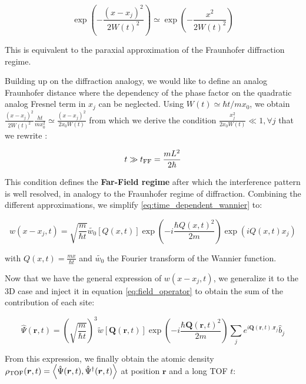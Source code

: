 \begin{equation}
    \exp \left(-\frac{\left(x-x_{j}\right)^{2}}{2 W(t)^{2}}\right) \simeq \exp \left(-\frac{x^{2}}{2 W(t)^{2}}\right)
\end{equation}

\noindent This is equivalent to the paraxial approximation of the Fraunhofer diffraction regime.

Building up on the diffraction analogy, we would like to define an analog Fraunhofer distance where the dependency of the phase factor on the quadratic analog Fresnel term in $x_j$ can be neglected. Using $W(t) \simeq \hbar t/m x_0$, we obtain $\frac{\left(x-x_{j}\right)^{2}}{2 W(t)^{2}} \frac{h t}{m x_{0}^{2}} \simeq \frac{\left(x-x_{j}\right)^{2}}{2 x_0 W(t)}$ from which we derive the condition $\frac{x_j^2}{2 x_0 W(t)} \ll 1, \forall j$ that we rewrite \cite{gerbier2008expansion,toth2008theory}:

\begin{equation}
    t \gg t_{\rm{FF}} = \frac{mL^2}{2 \hbar}
\end{equation}

\noindent This condition defines the \textbf{Far-Field regime} after which the interference pattern is well resolved, in analogy to the Fraunhofer regime of diffraction. Combining the different approximations, we simplify \ref{eq:time_dependent_wannier} to:

\begin{equation}
    w\left(x-x_{j}, t\right)=\sqrt{\frac{m}{\hbar t}} \tilde{w_0}[Q(x,t)] \exp\left(-i \frac{\hbar Q(x,t)^{2}}{2 m} \right) \exp\left(i Q(x,t) x_{j}\right)
\end{equation}

\noindent with $Q(x,t)=\frac{m x}{\hbar t}$ and $\tilde{w_0}$ the Fourier transform of the Wannier function. 

Now that we have the general expression of $w\left(x-x_{j}, t\right)$, we generalize it to the 3D case and inject it in equation \ref{eq:field_operator} to obtain the sum of the contribution of each site:

\begin{equation}
    \hat{\Psi} (\bm{r},t) = \left(\sqrt{\frac{m}{\hbar t}} \right)^3 \tilde{w}[\bm{Q}(\bm{r},t)] \exp\left(-i \frac{\hbar \bm{Q}(\bm{r},t)^{2}}{2 m} \right) \sum_j e^{i \bm{Q}(\bm{r},t). \bm{r}_{j}} \hat{b}_j
\end{equation}

\noindent From this expression, we finally obtain the atomic density $\rho_{\rm{TOF}}(\bm{r},t) = \left\langle\hat{\Psi} (\bm{r},t), \hat{\Psi}^{\dagger} (\bm{r},t)\right\rangle$ at position $\bm{r}$ and a long TOF $t$:

